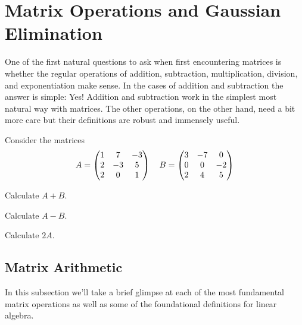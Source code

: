 \newpage\section{Matrix Operations and Gaussian Elimination} \label{S:10.2.MatrixAlgebra}
One of the first natural questions to ask when first encountering matrices is whether the
regular operations of addition, subtraction, multiplication, division, and exponentiation
make sense.  In the cases of addition and subtraction the answer is simple: Yes!  Addition
and subtraction work in the simplest most natural way with matrices.  The other operations,
on the other hand, need a bit more care but their definitions are robust and immensely
useful.


% 
\begin{problem}
Consider the matrices 
\[ A = \begin{pmatrix} 1 & 7 & -3 \\ 2 & -3 & 5 \\ 2 & 0 & 1 \end{pmatrix} \quad B = \begin{pmatrix} 3 & -7 & 0 \\ 0 & 0
    & -2 \\ 2 & 4 & 5 \end{pmatrix} \]
\ba
    \item Calculate $A+B$.
    \item Calculate $A-B$.
    \item Calculate $2A$.
\ea
\end{problem}

\subsection*{Matrix Arithmetic}
In this subsection we'll take a brief glimpse at each of the most fundamental matrix
operations as well as some of the foundational definitions for linear algebra.

